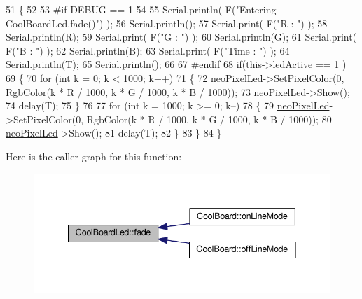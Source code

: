 \begin{DoxyCode}
51 \{
52 
53 \textcolor{preprocessor}{#if DEBUG == 1}
54 
55     Serial.println( F(\textcolor{stringliteral}{"Entering CoolBoardLed.fade()"}) );
56     Serial.println();
57     Serial.print( F(\textcolor{stringliteral}{"R : "}) );
58     Serial.println(R);
59     Serial.print( F(\textcolor{stringliteral}{"G : "}) );
60     Serial.println(G);
61     Serial.print( F(\textcolor{stringliteral}{"B : "}) );
62     Serial.println(B);
63     Serial.print( F(\textcolor{stringliteral}{"Time : "}) );
64     Serial.println(T);
65     Serial.println();
66 
67 \textcolor{preprocessor}{#endif  }
68     \textcolor{keywordflow}{if}(this->\hyperlink{class_cool_board_led_aadd04d2ecf123247718d77f42fba7f08}{ledActive} == 1 )
69     \{
70         \textcolor{keywordflow}{for} (\textcolor{keywordtype}{int} k = 0; k < 1000; k++) 
71         \{
72             \hyperlink{class_cool_board_led_ac2c13fa462a010cd9242bf297c013923}{neoPixelLed}->SetPixelColor(0, RgbColor(k * R / 1000, k * G / 1000, k * B / 1000));
73             \hyperlink{class_cool_board_led_ac2c13fa462a010cd9242bf297c013923}{neoPixelLed}->Show();
74             delay(T);
75         \}
76         
77         \textcolor{keywordflow}{for} (\textcolor{keywordtype}{int} k = 1000; k >= 0; k--) 
78         \{
79             \hyperlink{class_cool_board_led_ac2c13fa462a010cd9242bf297c013923}{neoPixelLed}->SetPixelColor(0, RgbColor(k * R / 1000, k * G / 1000, k * B / 1000));
80             \hyperlink{class_cool_board_led_ac2c13fa462a010cd9242bf297c013923}{neoPixelLed}->Show();
81             delay(T);
82         \}
83     \}
84 \}
\end{DoxyCode}
Here is the caller graph for this function\+:\nopagebreak
\begin{figure}[H]
\begin{center}
\leavevmode
\includegraphics[width=341pt]{de/dc0/class_cool_board_led_af1cacbaa88db8bcf6042c1083ba41155_icgraph}
\end{center}
\end{figure}
\mbox{\label{class_cool_board_led_ab778f5e7bed0ab74e3906d82110493c3}} 
